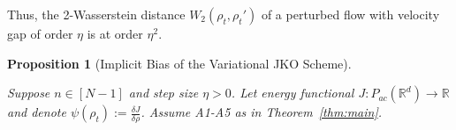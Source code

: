 \documentclass[reqno,11pt,letterpaper]{amsart}
\theoremstyle{plain}
\newtheorem{prop}{Proposition}
\theoremstyle{definition}
\theoremstyle{remark}
\newcommand{\wass}{\mathrm{GF}}
\newcommand{\wadel}{\frac{\delta J}{\delta \rho}}
\newcommand{\lr}[1]{\left(#1\right)}
\newcommand{\norm}[1]{\left\lVert#1\right\rVert}
\begin{document}
\noindent Thus, the 2-Wasserstein distance $W_{2} (\rho_{t}, \rho_{t}')$ of a perturbed flow with velocity gap of order $\eta$ is at order $\eta^{2}$.

\begin{prop}[Implicit Bias of the Variational JKO Scheme]\label{prop:implicit_JKO}

Suppose $n \in [N-1]$ and step size $\eta>0$. Let energy functional $J: {P}_{ac}(\mathbb{R}^{d}) \to \mathbb{R}$ and denote $\psi(\rho_{t}) := \wadel$. Assume A1-A5 as in Theorem~\ref{thm:main}.

\end{prop}
\end{document}
